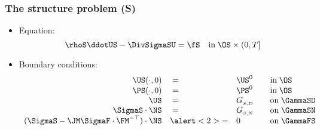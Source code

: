 \begin{frame}
  \frametitle{The structure problem (S)}

  \linespread{1.5}
  \begin{itemize}
  \item
    Equation:
    \begin{equation*}
      \rhoS\ddotUS - \DivSigmaSU =  \fS \quad \textrm{in}\;
      \OS\times (0,T]
    \end{equation*}
  \item
    Boundary conditions:
    \begin{equation*}
      \begin{array}{rlll}
        \US(\cdot, 0) &\;=& \US^0&\quad \textrm{in}\;\OS \\
        \PS(\cdot, 0) &\;=& \PS^0&\quad \textrm{in}\;\OS \\
        \US &\;=& G_{_{S,D}}&\quad \textrm{on}\;\GammaSD \\
        \SigmaS \cdot \NS &\;=& G_{_{S,N}}&\quad \textrm{on}\;\GammaSN \\
        (\SigmaS - \JM \SigmaF\cdot\FM^{-\top})\cdot \NS &\alert<2>{=}&0
        &\quad \textrm{on}\;\GammaFS \\
      \end{array}
    \end{equation*}
  \end{itemize}
  \linespread{1.0}

\end{frame}
